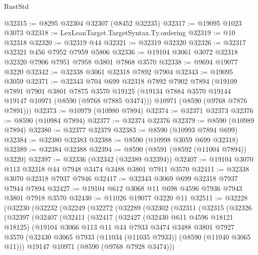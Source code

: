 \begin{lexlean}{RustStd}
\begin{coremodule}
@32315 := @8295 @32304 @32307 (@8452 @32235)
@32317 := @19095 @1023 @3073
@32318 := LexLeanTarget.TargetSyntax.Ty.ordering
@32319 := @10 @32318
@32320 := @32319 @44
@32321 := @32319 @32320
@32326 := @32317 @32321 @456 @7952 @7959 @5806
@32336 := @19104 @3061 @3072 @32318 @32320 @7906 @7951 @7958 @3801 @7868 @3570
@32338 := @9694 @19077 @3220
@32342 := @32338 @3061 @32318 @7892 @7904
@32343 := @19095 @3059
@32371 := @32343
    @704
    @699
    @32318
    @7892
    @7902
    @7894
    (@19109
      @7891
      @7901
      @3801
      @7875
      @3570
      @19125
      (@19134 @7884 @3570 @19144 @19147 @10971 (@8590 (@9768 @7885 @3474)))
      @10971
      (@8590 (@9768 @7876 @7891)))
@32373 := @10979 (@10980 @7894)
@32374 := @32371 @32373
@32376 := @8590 (@10984 @7894)
@32377 := @32374 @32376
@32379 := @8590 (@10989 @7894)
@32380 := @32377 @32379
@32383 := @8590 (@10993 @7894 @699)
@32384 := @32380 @32383
@32388 := @8590 (@10998 @3059 @699 @32318)
@32389 := @32384 @32388
@32394 := @8590 (@8591 (@8592 (@11004 @7894)) @3220)
@32397 := @32336 (@32342 (@32389 @32394))
@32407 := @19104 @3070 @113 @32318 @44 @7948 @3474 @3488 @3801 @7911 @3570
@32411 := @32338 @3070 @32318 @7937 @7946
@32417 := @32343 @3069 @699 @32318 @7937 @7944 @7894
@32427 := @19104 @612 @3068 @11 @698 @4596 @7936 @7943 @3801 @7918 @3570
@32430 := @11026 @19077 @3220 @11
@32511 := @32228
    (@32230
      (@32232
        (@32249
          (@32272
            (@32289
              (@32302
                (@32311
                  (@32315
                    (@32326
                      (@32397
                        (@32407
                          (@32411
                            (@32417
                              (@32427
                                (@32430 @611 @4596 @18121 @18125)
                                (@19104
                                  @3066
                                  @113
                                  @11
                                  @44
                                  @7933
                                  @3474
                                  @3488
                                  @3801
                                  @7927
                                  @3570
                                  (@32430
                                    @3065
                                    @7933
                                    (@11034 (@11035 @7933))
                                    (@8590 (@11040 @3065 @11)))
                                  @19147
                                  @10971
                                  (@8590 (@9768 @7928 @3474)))

\end{coremodule}
\end{lexlean}
